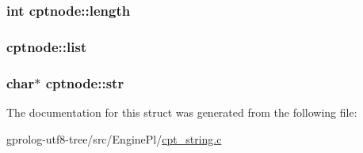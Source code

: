 \subsubsection[{\texorpdfstring{length}{length}}]{\setlength{\rightskip}{0pt plus 5cm}int cptnode\+::length}\hypertarget{structcptnode_a18110f6aa5dcbadb7233fb49ee931ee2}{}\label{structcptnode_a18110f6aa5dcbadb7233fb49ee931ee2}
\subsubsection[{\texorpdfstring{list}{list}}]{ cptnode\+::list}\hypertarget{structcptnode_a957239c445f0b92b306830b91603b8e0}{}\label{structcptnode_a957239c445f0b92b306830b91603b8e0}
\subsubsection[{\texorpdfstring{str}{str}}]{\setlength{\rightskip}{0pt plus 5cm}char$\ast$ cptnode\+::str}\hypertarget{structcptnode_a0f39bf735e3c110c5559c56a2865e3e6}{}\label{structcptnode_a0f39bf735e3c110c5559c56a2865e3e6}


The documentation for this struct was generated from the following file\+:\begin{DoxyCompactItemize}
\item 
gprolog-\/utf8-\/tree/src/\+Engine\+Pl/\hyperlink{cpt__string_8c}{cpt\+\_\+string.\+c}\end{DoxyCompactItemize}
